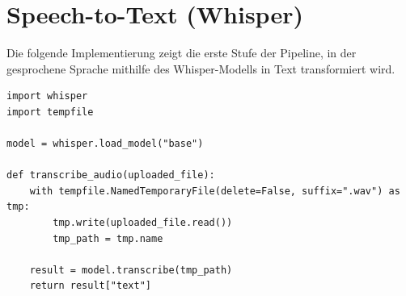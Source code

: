 




\section{Speech-to-Text (Whisper)}

Die folgende Implementierung zeigt die erste Stufe der Pipeline, in der gesprochene Sprache mithilfe des Whisper-Modells in Text transformiert wird.

\begin{lstlisting}[caption={speech_to_text.py – Audio-Transkription mittels Whisper}]
import whisper
import tempfile

model = whisper.load_model("base")

def transcribe_audio(uploaded_file):
    with tempfile.NamedTemporaryFile(delete=False, suffix=".wav") as tmp:
        tmp.write(uploaded_file.read())
        tmp_path = tmp.name

    result = model.transcribe(tmp_path)
    return result["text"]
\end{lstlisting}

